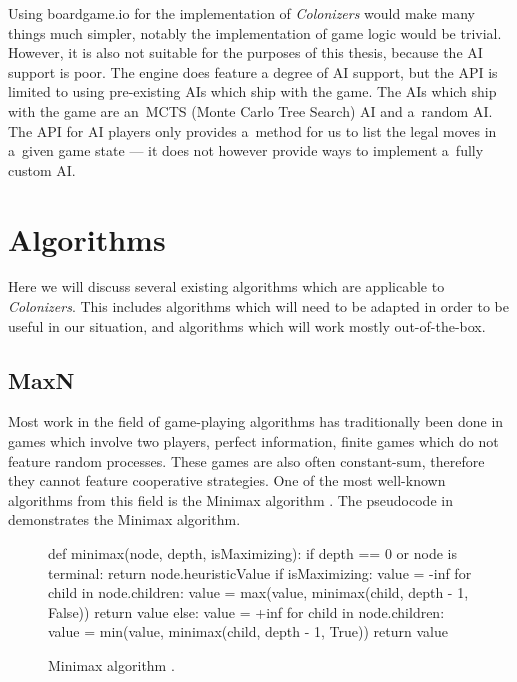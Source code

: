 Using boardgame.io for the implementation of \emph{Colonizers} would make many things
much simpler, notably the implementation of game logic would be trivial.
However, it is also not suitable for the purposes of this thesis, because the AI
support is poor. The engine does feature a degree of AI support, but the API
is limited to using pre-existing AIs which ship with the game. The AIs which
ship with the game are an~MCTS (Monte Carlo Tree Search) AI and
a~random AI. The API for AI players only provides a~method for us to list the legal moves in
a~given game state --- it does not however provide ways to implement a~fully
custom AI.

\clearpage
\section{Algorithms}

Here we will discuss several existing algorithms which are applicable to \emph{Colonizers}.
This includes algorithms which will need to be adapted in order to be useful in our
situation, and algorithms which will work mostly out-of-the-box.

\subsection{MaxN}
\label{rw:maxn}

Most work in the field of game-playing algorithms has traditionally been done
in games which involve two players, perfect information, finite games which
do not feature random processes. These games are also often constant-sum, therefore
they cannot feature cooperative strategies. One of the most well-known
algorithms from this field is the Minimax algorithm \cite{Millington09}. The pseudocode
in  demonstrates the Minimax algorithm.

\begin{figure}[h!]
\begin{code}
def minimax(node, depth, isMaximizing):
    if depth == 0 or node is terminal:
        return node.heuristicValue
    if isMaximizing:
        value = -inf
        for child in node.children:
            value = max(value, minimax(child, depth - 1, False))
        return value
    else:
        value = +inf
        for child in node.children:
            value = min(value, minimax(child, depth - 1, True))
        return value
\end{code}
\caption{Minimax algorithm \cite{Millington09}.}\label{figrw:minimax}
\end{figure}

